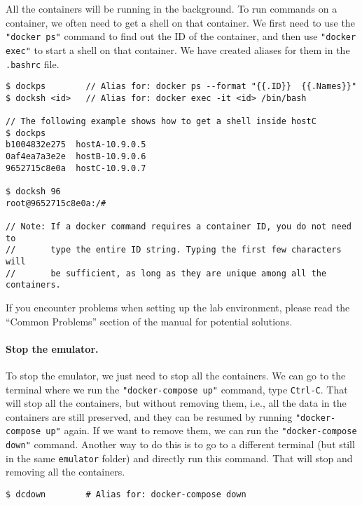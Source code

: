 All the containers will be running in the background. To run
commands on a container, we often need to get a shell on
that container. We first need to use the \texttt{"docker ps"}  
command to find out the ID of the container, and then
use \texttt{"docker exec"} to start a shell on that 
container. We have created aliases for them in
the \texttt{.bashrc} file.

\begin{lstlisting}
$ dockps        // Alias for: docker ps --format "{{.ID}}  {{.Names}}" 
$ docksh <id>   // Alias for: docker exec -it <id> /bin/bash

// The following example shows how to get a shell inside hostC
$ dockps
b1004832e275  hostA-10.9.0.5
0af4ea7a3e2e  hostB-10.9.0.6
9652715c8e0a  hostC-10.9.0.7

$ docksh 96
root@9652715c8e0a:/#  

// Note: If a docker command requires a container ID, you do not need to 
//       type the entire ID string. Typing the first few characters will 
//       be sufficient, as long as they are unique among all the containers. 
\end{lstlisting}





If you encounter problems when setting up the lab environment, 
please read the ``Common Problems'' section of the manual
for potential solutions.


\paragraph{Stop the emulator.} 
To stop the emulator, we just need to stop all the containers. 
We can go to the terminal where we run the 
\texttt{"docker-compose up"} command, type \texttt{Ctrl-C}.
That will stop all the containers, but without removing them, i.e., all the data 
in the containers are still preserved, and they can be resumed by 
running \texttt{"docker-compose up"} again. 
If we want to remove them, we can run the \texttt{"docker-compose down"}
command. Another way to do this is to go to a different terminal (but still in the
same \texttt{emulator} folder) and directly run this command.  
That will stop and removing all the containers.

\begin{lstlisting}
$ dcdown        # Alias for: docker-compose down
\end{lstlisting}



